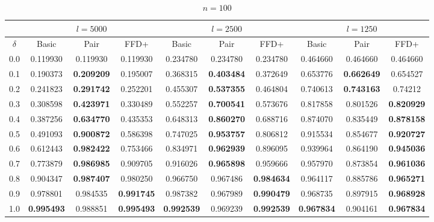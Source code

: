 \documentclass[oribibl]{llncs}
\begin{document}
\begin{table}[!htb]
\centering
\caption{$n = 100$}
\begin{tabular}{c@{\hspace{15pt}}c@{\hspace{10pt}}c@{\hspace{10pt}}c@{\hspace{7pt}}| @{\hspace{7pt}}c@{\hspace{10pt}}c@{\hspace{10pt}}c@{\hspace{7pt}}| @{\hspace{7pt}} c@{\hspace{10pt}}c@{\hspace{10pt}}c}
	\noalign{\smallskip}
	& \multicolumn{3}{c}{$l = 5000$} & \multicolumn{3}{c}{$l = 2500$} & \multicolumn{3}{c}{$l = 1250$} \\
	\hline\noalign{\smallskip}
	$\delta$ & Basic & Pair & FFD+ & Basic & Pair & FFD+ & Basic & Pair & FFD+ \\
	\noalign{\smallskip}
	\hline 
	\noalign{\smallskip}
	0.0 & 0.119930 & 0.119930 & 0.119930 & 0.234780 & 0.234780 & 0.234780 & 0.464660 & 0.464660 & 0.464660 \\
	0.1 & 0.190373 & \textbf{0.209209} & 0.195007 & 0.368315 & \textbf{0.403484} & 0.372649 & 0.653776 & \textbf{0.662649} & 0.654527 \\
	0.2 & 0.241823 & \textbf{0.291742} & 0.252201 & 0.455307 & \textbf{0.537355} & 0.464804 & 0.740613 & \textbf{0.743163} & 0.74212 \\
	0.3 & 0.308598 & \textbf{0.423971} & 0.330489 & 0.552257 & \textbf{0.700541} & 0.573676 & 0.817858 & 0.801526 & \textbf{0.820929} \\
	0.4 & 0.387256 & \textbf{0.634770} & 0.435353 & 0.648313 & \textbf{0.860270} & 0.688716 & 0.874070 & 0.835449 & \textbf{0.878158} \\
	0.5 & 0.491093 & \textbf{0.900872} & 0.586398 & 0.747025 & \textbf{0.953757} & 0.806812 & 0.915534 & 0.854677 & \textbf{0.920727} \\
	0.6	& 0.612443 & \textbf{0.982422} & 0.753466 & 0.834971 & \textbf{0.962939} & 0.896095 & 0.939964 & 0.864190 & \textbf{0.945036} \\
	0.7 & 0.773879 & \textbf{0.986985} & 0.909705 & 0.916026 & \textbf{0.965898} & 0.959666 & 0.957970 & 0.873854 & \textbf{0.961036} \\
	0.8	& 0.904347 & \textbf{0.987407} & 0.980250 & 0.966750 & 0.967486 & \textbf{0.984634} & 0.964117 & 0.885786 & \textbf{0.965271} \\
	0.9	& 0.978801 & 0.984535 &	\textbf{0.991745} & 0.987382 & 0.967989 & \textbf{0.990479} & 0.968735 & 0.897915 & \textbf{0.968928} \\
	1.0 & \textbf{0.995493} & 0.988851 & \textbf{0.995493} & \textbf{0.992539} & 0.969239 & \textbf{0.992539} & \textbf{0.967834} & 0.904161 & \textbf{0.967834} \\
	\hline
\end{tabular}
\label{table:n100}
\end{table}	
\end{document}
